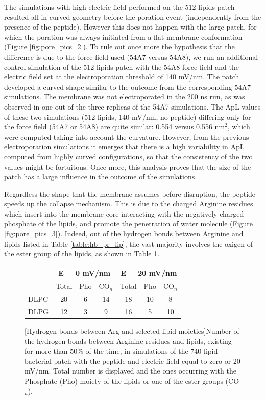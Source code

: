 The simulations with high electric field performed on the 512 lipids patch resulted all in curved geometry before the poration event (independently from the presence of the peptide). However this does not happen with the large patch, for which the poration was always initiated from a flat membrane conformation (Figure \ref{fig:pore_pics_2}).
%
To rule out once more the hypothesis that the difference is due to the force field used (54A7 versus 54A8), we run an additional control simulation of the 512 lipids patch with the 54A8 force field and the electric field set at the electroporation threshold of 140 mV/nm. The patch developed a curved shape similar to the outcome from the corresponding 54A7 simulations. The membrane was not electroporated in the 200 ns run, as was observed in one out of the three replicas of the 54A7 simulations.
%
The ApL values of these two simulations (512 lipids, 140 mV/nm, no peptide) differing only for the force field (54A7 or 54A8) are quite similar: 0.554 versus 0.556 nm$^2$, which were computed taking into account the curvature.
%
However, from the previous electroporation simulations it emerges that there is a high variability in ApL computed from highly curved configurations, so that the consistency of the two values might be fortuitous.
%
Once more, this analysis proves that the size of the patch has a large influence in the outcome of the simulations.

Regardless the shape that the membrane assumes before disruption, the peptide speeds up the collapse mechanism. This is due to the charged Arginine residues which insert into the membrane core interacting with the negatively charged phosphate of the lipids, and promote the penetration of water molecule (Figure \ref{fig:pore_pics_3}).
%
Indeed, out of the hydrogen bonds between Arginine and lipids listed in Table \ref{table:hb_pr_lip}, the vast majority involves the oxigen of the ester group of the lipids, as shown in Table \ref{table:hb_ester}.

\begin{figure}[t!]
\centering
 \def\arraystretch{1.6}
\begin{tabular}{l|ccc|ccc}
\hline
& \multicolumn{3}{c|}{\textbf{E = 0 mV/nm}} & \multicolumn{3}{c}{\textbf{E = 20 mV/nm}} \\
\hline
& Total & Pho & CO$_n$ & Total & Pho & CO$_n$ \\ 
\hline
DLPC & 20 & 6 & 14 & 18 & 10 & 8 \\
DLPG &12 & 3 & 9 & 16 & 5 & 10 \\
\hline
 \end{tabular}
[Hydrogen bonds between Arg and selected lipid moieties]{Number of the hydrogen bonds between Arginine residues and lipids, existing for more than 50\% of the time, in simulations of the 740 lipid bacterial patch with the peptide and electric field equal to zero or 20 mV/nm. Total number is displayed and the ones occurring with the Phosphate (Pho) moiety of the lipids or one of the ester groups (CO$_n$).}
\label{table:hb_ester}
\end{figure}

